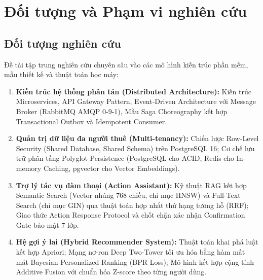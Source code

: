 \documentclass[12pt,a4paper]{report}
\begin{document}
\section{Đối tượng và Phạm vi nghiên cứu}

\subsection{Đối tượng nghiên cứu}
Đề tài tập trung nghiên cứu chuyên sâu vào các mô hình kiến trúc phần mềm, mẫu thiết kế và thuật toán học máy:
\begin{enumerate}
    \item \textbf{Kiến trúc hệ thống phân tán (Distributed Architecture):} Kiến trúc Microservices, API Gateway Pattern, Event-Driven Architecture với Message Broker (RabbitMQ AMQP 0-9-1), Mẫu Saga Choreography kết hợp Transactional Outbox và Idempotent Consumer.
    \item \textbf{Quản trị dữ liệu đa người thuê (Multi-tenancy):} Chiến lược Row-Level Security (Shared Database, Shared Schema) trên PostgreSQL 16; Cơ chế lưu trữ phân tầng Polyglot Persistence (PostgreSQL cho ACID, Redis cho In-memory Caching, pgvector cho Vector Embeddings).
    \item \textbf{Trợ lý tác vụ đàm thoại (Action Assistant):} Kỹ thuật RAG kết hợp Semantic Search (Vector nhúng 768 chiều, chỉ mục HNSW) và Full-Text Search (chỉ mục GIN) qua thuật toán hợp nhất thứ hạng tương hỗ (RRF); Giao thức Action Response Protocol và chốt chặn xác nhận Confirmation Gate bảo mật 7 lớp.
    \item \textbf{Hệ gợi ý lai (Hybrid Recommender System):} Thuật toán khai phá luật kết hợp Apriori; Mạng nơ-ron Deep Two-Tower tối ưu hóa bằng hàm mất mát Bayesian Personalized Ranking (BPR Loss); Mô hình kết hợp cộng tính Additive Fusion với chuẩn hóa Z-score theo từng người dùng.
\end{enumerate}
\end{document}
